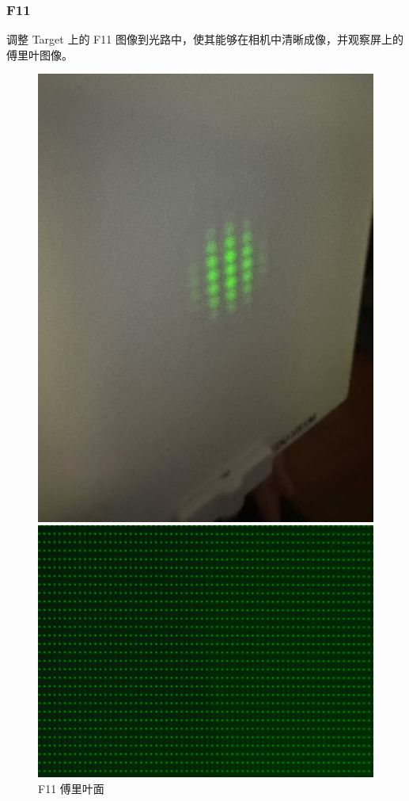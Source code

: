 \documentclass{ctexart}
\begin{document}
\subsubsection{F11}
调整 Target 上的 F11 图像到光路中，使其能够在相机中清晰成像，并观察屏上的傅里叶图像。
\begin{figure}[H]
  \centering
  \begin{minipage}[b]{0.2\textwidth}
    \centering
    \includegraphics[width=\textwidth]{pictures/微信图片_20241017164819.jpg}
    \caption{F11 傅里叶面}
  \end{minipage}
  \hspace{0.1\textwidth} %
  \begin{minipage}[b]{0.3\textwidth}
    \centering
    \includegraphics[width=\textwidth]{pictures/F11-nomask.png}

\end{minipage}
\end{figure}
\end{document}
